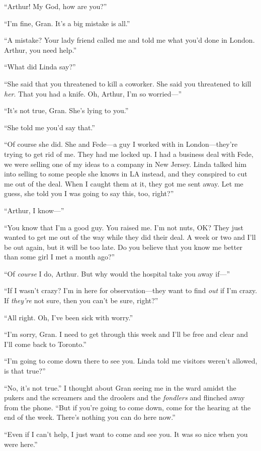 “Arthur! My God, how are you?”

“I’m fine, Gran. It’s a big mistake is all.”

“A mistake? Your lady friend called me and told me what you’d done
in London. Arthur, you need help.”

“What did Linda say?”

“She said that you threatened to kill a coworker. She said you
threatened to kill \emph{her}. That you had a knife. Oh, Arthur,
I’m so worried—”

“It’s not true, Gran. She’s lying to you.”

“She told me you’d say that.”

“Of course she did. She and Fede—a guy I worked with in
London—they’re trying to get rid of me. They had me locked up. I
had a business deal with Fede, we were selling one of my ideas to a
company in New Jersey. Linda talked him into selling to some people
she knows in LA instead, and they conspired to cut me out of the
deal. When I caught them at it, they got me sent away. Let me
guess, she told you I was going to say this, too, right?”

“Arthur, I know—”

“You know that I’m a good guy. You raised me. I’m not nuts, OK?
They just wanted to get me out of the way while they did their
deal. A week or two and I’ll be out again, but it will be too late.
Do you believe that you know me better than some girl I met a month
ago?”

“Of \emph{course} I do, Arthur. But why would the hospital take you
away if—”

“If I wasn’t crazy? I’m in here for observation—they want to find
\emph{out} if I’m crazy. If \emph{they’re} not sure, then you can’t
be sure, right?”

“All right. Oh, I’ve been sick with worry.”

“I’m sorry, Gran. I need to get through this week and I’ll be free
and clear and I’ll come back to Toronto.”

“I’m going to come down there to see you. Linda told me visitors
weren’t allowed, is that true?”

“No, it’s not true.” I thought about Gran seeing me in the ward
amidst the pukers and the screamers and the droolers and the
\emph{fondlers} and flinched away from the phone. “But if you’re
going to come down, come for the hearing at the end of the week.
There’s nothing you can do here now.”

“Even if I can’t help, I just want to come and see you. It was so
nice when you were here.”

